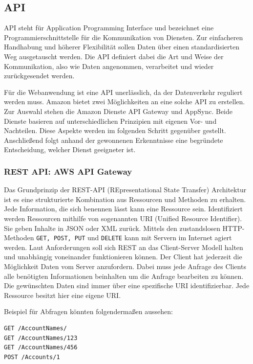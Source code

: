 

\subsection{API}
API steht für Application Programming Interface und bezeichnet eine Programmierschnittstelle für die Kommunikation von Diensten.
Zur einfacheren Handhabung und höherer Flexibilität sollen Daten über einen standardisierten Weg ausgetauscht werden. Die API definiert
dabei die Art und Weise der Kommunikation, also wie Daten angenommen, verarbeitet und wieder zurückgesendet werden.

Für die Webanwendung ist eine API unerlässlich, da der Datenverkehr reguliert werden muss.
Amazon bietet zwei Möglichkeiten an eine solche API zu erstellen.
Zur Auswahl stehen die Amazon Dienste API Gateway und AppSync.
Beide Dienste basieren auf unterschiedlichen Prinzipien mit eigenen Vor- und Nachteilen.
Diese Aspekte werden im folgenden Schritt gegenüber gestellt.
Anschließend folgt anhand der gewonnenen Erkenntnisse eine begründete Entscheidung, welcher Dienst geeigneter ist.

\clearpage
\subsubsection{REST API: AWS API Gateway}
Das Grundprinzip der REST-API (REpresentational State Transfer) Architektur ist es eine strukturierte Kombination aus Ressourcen und Methoden zu erhalten.
Jede Information, die sich benennen lässt kann eine Ressource sein.
Identifiziert werden Ressourcen mithilfe von sogenannten URI (Unified Resource Identifier).
Sie geben Inhalte in JSON oder XML zurück.
Mittels den zustandslosen HTTP-Methoden \verb+GET, POST, PUT+ und \verb+DELETE+ kann mit Servern im Internet agiert werden.
Laut Anforderungen soll sich REST an das Client-Server Modell halten und unabhängig voneinander funktionieren können.
Der Client hat jederzeit die Möglichkeit Daten vom Server anzufordern.
Dabei muss jede Anfrage des Clients alle benötigten Informationen beinhalten um die Anfrage bearbeiten zu können.
Die gewünschten Daten sind immer über eine spezifische URI identifizierbar.
Jede Ressource besitzt hier eine eigene URI.\cite{REST}

Beispiel für Abfragen könnten folgendermaßen aussehen:

\begin{lstlisting}[basicstyle=\ttfamily, breaklines=true , frame = single, backgroundcolor=\color{flashwhite} ]
GET /AccountNames/
GET /AccountNames/123
GET /AccountNames/456
POST /Accounts/1
\end{lstlisting}

